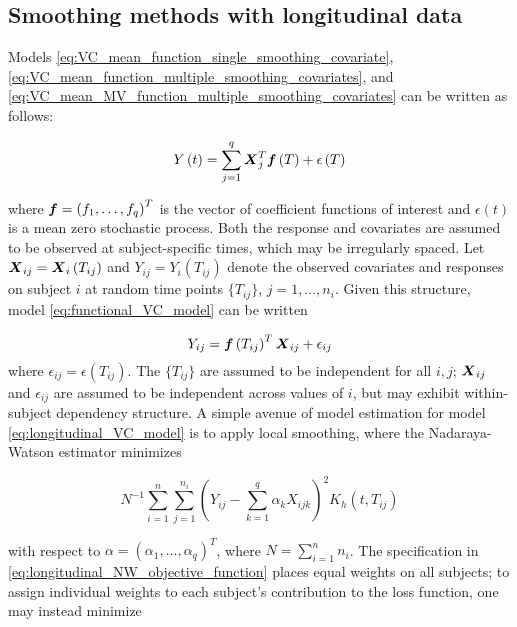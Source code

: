 \documentclass[12pt]{article}
\newcommand{\bff}{\mbox{\boldmath $f$}}
\newcommand{\bfX}{\mbox{\boldmath $X$}}
\begin{document}
\subsection{Smoothing methods with longitudinal data}

Models \ref{eq:VC_mean_function_single_smoothing_covariate}, \ref{eq:VC_mean_function_multiple_smoothing_covariates}, and \ref{eq:VC_mean_MV_function_multiple_smoothing_covariates} can be written as follows:

\begin{equation} \label{eq:functional_VC_model}
Y\left(t\right) = \sum_{j=1}^q \bfX_j^T \bff \left(T\right) + \epsilon\left(T\right)
\end{equation}

where $\bff = \left(f_1,\dots, f_q \right)^T$ is the vector of coefficient functions of interest and $\epsilon\left(t\right)$ is a mean zero stochastic process. Both the response and covariates are assumed to be observed at subject-specific times, which may be irregularly spaced. Let $\bfX_{ij} = \bfX_i\left(T_{ij}\right)$ and $Y_{ij} = Y_i\left(T_{ij}\right)$ denote the observed covariates and responses on subject $i$ at random time points $\lbrace T_{ij} \rbrace$, $j=1,\dots,n_i$. Given this structure, model  \ref{eq:functional_VC_model} can be written 
   
\begin{equation} \label{longitudinal_VC_model}
Y_{ij} = \bff\left(T_{ij}\right)^T\bfX_{ij} + \epsilon_{ij}
\end{equation}
\noindent
where $\epsilon_{ij} = \epsilon\left(T_{ij}\right)$. The $\lbrace T_{ij} \rbrace$ are assumed to be independent for all $i,j$; $\bfX_{ij}$ and $\epsilon_{ij}$ are assumed to be independent across values of $i$, but may exhibit within-subject dependency structure.  A simple avenue of model estimation for model \ref{eq:longitudinal_VC_model} is to apply local smoothing, where the Nadaraya-Watson estimator minimizes 

\begin{equation} \label{eq:longitudinal_NW_objective_function}
N^{-1} \sum_{i=1}^{n} \sum_{j=1}^{n_i} \left(Y_{ij} - \sum_{k=1}^q \alpha_k X_{ijk} \right)^2 K_h\left(t,T_{ij}\right)
\end{equation}
\noindent

with respect to $\alpha = \left(\alpha_1,\dots, \alpha_q \right)^T$, where $N = \sum_{i=1}^n n_i$. The specification in \ref{eq:longitudinal_NW_objective_function} places equal weights on all subjects; to assign individual weights to each subject's contribution to the loss function, one may instead minimize
\end{document}

